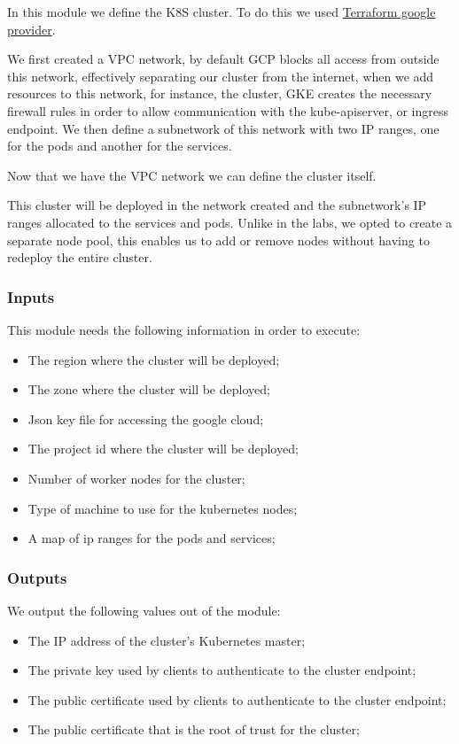 \documentclass[12pt,a4paper,oneside]{report}
\begin{document}
In this module we define the \ac{K8S} cluster.
To do this we used \href{https://registry.terraform.io/providers/hashicorp/google/latest}{Terraform google provider}.

We first created a \ac{VPC} network, by default \ac{GCP} blocks all access from outside this network, effectively separating our cluster from the internet, when we add resources to this network, for instance, the cluster, \ac{GKE} creates the necessary firewall rules in order to allow communication with the kube-apiserver, or ingress endpoint. We then define a subnetwork of this network with two \ac{IP} ranges, one for the pods and another for the services.

Now that we have the \ac{VPC} network we can define the cluster itself.

This cluster will be deployed in the network created and the subnetwork's \ac{IP} ranges allocated to the services and pods. Unlike in the labs, we opted to create a separate node pool, this enables us to add or remove nodes without having to redeploy the entire cluster.

\subsubsection{Inputs}
This module needs the following information in order to execute:
\begin{itemize}
    \item The region where the cluster will be deployed;
    \item The zone where the cluster will be deployed;
    \item Json key file for accessing the google cloud;
    \item The project id where the cluster will be deployed;
    \item Number of worker nodes for the cluster;
    \item Type of machine to use for the kubernetes nodes;
    \item A map of ip ranges for the pods and services;
\end{itemize}

\subsubsection{Outputs}
We output the following values out of the module:
\begin{itemize}
    \item The IP address of the cluster's Kubernetes master;
    \item The private key used by clients to authenticate to the cluster endpoint;
    \item The public certificate used by clients to authenticate to the cluster endpoint;
    \item The public certificate that is the root of trust for the cluster;
\end{itemize}
\end{document}
